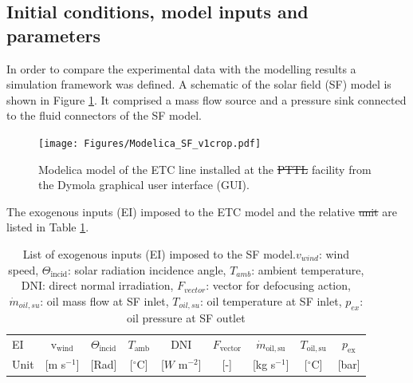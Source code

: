 \documentclass[final,3p,times,review]{elsarticle}
\providecommand{\DIFadd}[1]{{\protect\color{blue}\uwave{#1}}} %
\providecommand{\DIFdel}[1]{{\protect\color{red}\sout{#1}}}                      %
\providecommand{\DIFaddbegin}{} %
\providecommand{\DIFaddend}{} %
\providecommand{\DIFdelbegin}{} %
\providecommand{\DIFdelend}{} %
\providecommand{\DIFaddFL}[1]{\DIFadd{#1}} %
\providecommand{\DIFdelFL}[1]{\DIFdel{#1}} %
\providecommand{\DIFaddbeginFL}{} %
\providecommand{\DIFaddendFL}{} %
\providecommand{\DIFdelbeginFL}{} %
\providecommand{\DIFdelendFL}{} %
\begin{document}
\subsection{Initial conditions, model inputs and parameters}
%
\label{subsec:SF_model}
In order to compare the  experimental data with the modelling results a simulation framework was defined. A schematic of the solar field (SF) model is shown in Figure \ref{fig:SF_ModModel}. It comprised a mass flow source and a pressure sink connected to the fluid connectors of the SF model. 
%
\begin{figure}[h!]
\centering
\texttt{[image: Figures/Modelica\_SF\_v1crop.pdf]}
\caption{Modelica model of the ETC line installed at the \DIFdelbeginFL \DIFdelFL{PTTL }\DIFdelendFL \DIFaddbeginFL \DIFaddFL{HTF Loop }\DIFaddendFL facility from the Dymola graphical user interface (GUI).}
\label{fig:SF_ModModel}
\end{figure}
%
The exogenous inputs (EI) imposed to the ETC model and the relative \DIFdelbegin \DIFdel{unit }\DIFdelend \DIFaddbegin \DIFadd{units }\DIFaddend are listed in Table \ref{Tab:SF_Inputs}. 
%
\begin{table}[h!]
\centering
\caption{List of exogenous inputs (EI) imposed to the SF model.$v_{wind}$: wind speed, $\Theta_\mathrm{incid}$: solar radiation incidence angle, $T_{amb}$: ambient temperature, DNI: direct normal irradiation, $F_{vector}$: vector for defocusing action, $\dot{m}_{oil,su}$: oil mass flow at SF inlet,  $T_{oil,su}$: oil temperature at SF inlet, $p_{ex}$: oil pressure at SF outlet}
\begin{tabular}{lcccccccc}
\toprule
EI   & v$_\mathrm{wind}$   & $\Theta_\mathrm{incid}$ & $T_\mathrm{amb}$      & DNI                & $F_\mathrm{vector}$   & $\dot{m}_\mathrm{oil,su}$ & $T_\mathrm{oil,su}$   & $p_\mathrm{ex}$ \\
Unit & [m s$^{-1}$] & [Rad]    &  [$^{\circ}$C] &  [$W$ m$^{-2}$]      & [-]            &  [kg s$^{-1}$]     &  [$^{\circ}$C] &  [bar] \\
\bottomrule
\end{tabular}
\label{Tab:SF_Inputs}
\end{table}
%
\end{document}
